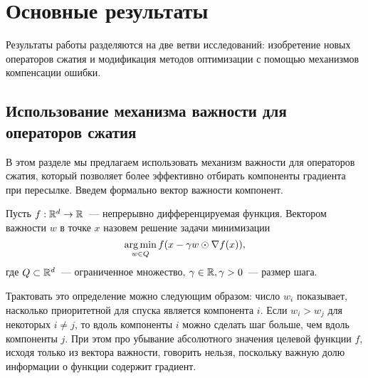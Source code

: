 \section{Основные результаты}

Результаты работы разделяются на две ветви исследований: изобретение новых операторов сжатия и модификация методов оптимизации с помощью механизмов компенсации ошибки.

\subsection{Использование механизма важности для операторов сжатия}

    В этом разделе мы предлагаем использовать механизм важности для операторов сжатия, который позволяет более эффективно отбирать компоненты градиента при пересылке. Введем формально вектор важности компонент.

    \begin{definition}
        Пусть $f: \mathbb{R}^d \to \mathbb{R}$~--- непрерывно дифференцируемая функция. Вектором важности $w$ в точке $x$ назовем решение задачи минимизации
        \begin{equation}\label{eq:importance_def}
            \operatorname*{arg\,min}_{w \in Q} f(x - \gamma w \odot \nabla f(x)),
        \end{equation}
        где $Q \subset \mathbb{R}^d$~--- ограниченное множество, $\gamma \in \mathbb{R}, \gamma > 0$~--- размер шага.
    \end{definition}
    Трактовать это определение можно следующим образом: число $w_i$ показывает, насколько приоритетной для спуска является компонента $i$. Если $w_i > w_j$ для некоторых $i \neq j$, то вдоль компоненты $i$ можно сделать шаг больше, чем вдоль компоненты $j$. При этом про убывание абсолютного значения целевой функции $f$, исходя только из вектора важности, говорить нельзя, поскольку важную долю информации о функции содержит градиент.

